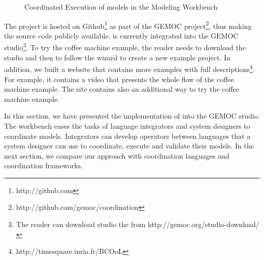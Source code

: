 \begin{figure}[]
	\centering
	\caption{Coordinated Execution of models in the Modeling Workbench}
	\label{fig:subfigureExample1}
\end{figure}

The project \bcool is hosted on Github\footnote{http://github.com} as part of the GEMOC project\footnote{http://github.com/gemoc/coordination}, thus making the source code publicly available. \bcool is currently integrated into the GEMOC studio\footnote{The reader can download studio the from http://gemoc.org/studio-download/}. To try the coffee machine example, the reader needs to download the studio and then to follow the wizard to create a new example project. In addition, we built a website that contains more examples with full descriptions\footnote{http://timesquare.inria.fr/BCOoL}. For example, it contains a video that presents the whole flow of the coffee machine example. The site contains also an additional way to try the coffee machine example. 

In this section, we have presented the implementation of \bcool into the GEMOC studio. The workbench eases the tasks of language integrators and system designers to coordinate models. Integrators can develop operators between languages that a system designer can use to coordinate, execute and validate their models. In the next section, we compare our approach with coordination languages and coordination frameworks.  

